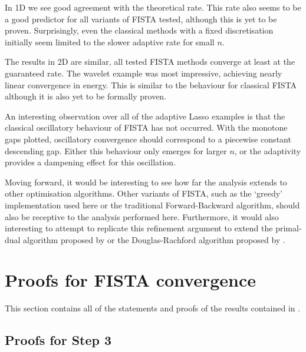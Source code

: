 \documentclass[10pt,a4paper,onecolumn]{article}
\numberwithin{equation}{section}
\begin{document}
In 1D we see good agreement with the theoretical rate. This rate also seems to be a good predictor for all variants of FISTA tested, although this is yet to be proven. Surprisingly, even the classical methods with a fixed discretisation initially seem limited to the slower adaptive rate for small $n$.

The results in 2D are similar, all tested FISTA methods converge at least at the guaranteed rate. The wavelet example was most impressive, achieving nearly linear convergence in energy. This is similar to the behaviour for classical FISTA although it is also yet to be formally proven.

An interesting observation over all of the adaptive Lasso examples is that the classical oscillatory behaviour of FISTA has not occurred. With the monotone gaps plotted, oscillatory convergence should correspond to a piecewise constant descending gap. Either this behaviour only emerges for larger $n$, or the adaptivity provides a dampening effect for this oscillation.

Moving forward, it would be interesting to see how far the analysis extends to other optimisation algorithms. Other variants of FISTA, such as the `greedy' implementation used here or the traditional Forward-Backward algorithm, should also be receptive to the analysis performed here. Furthermore, it would also interesting to attempt to replicate this refinement argument to extend the primal-dual algorithm proposed by \citet{Chambolle2011} or the Douglas-Rachford algorithm proposed by \citet{Douglas1956}.

\newpage\appendix
\section{Proofs for FISTA convergence}\label{app: FISTA convergence}
This section contains all of the statements and proofs of the results contained in .

\subsection{Proofs for Step 3}
\end{document}
